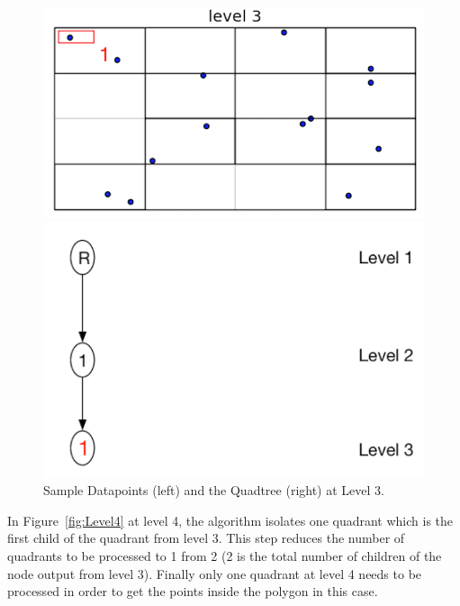 \begin{figure}[H]
  \centering
  \vspace{0.5in}
  \begin{minipage}[b]{0.35\textwidth}
    \includegraphics[width=\textwidth]{Images/1_1Quad1_3}
  \end{minipage}
  \hfill
  \begin{minipage}[b]{0.5\textwidth}
    \includegraphics[width=\textwidth]{Images/1Quad_3_tree}
  \end{minipage}
  \vspace{0.5in}
\caption{Sample Datapoints (left) and the Quadtree (right) at Level 3.}
   \label{fig:Level3}
\end{figure}


In Figure~\ref{fig:Level4} at level 4, the algorithm isolates one quadrant which is the first child of the quadrant from level 3. This step reduces the number of quadrants to be processed to 1 from 2 (2 is the total number of children of the node output from level 3).
Finally only one quadrant at level 4 needs to be processed in order to get the points inside the polygon in this case.


